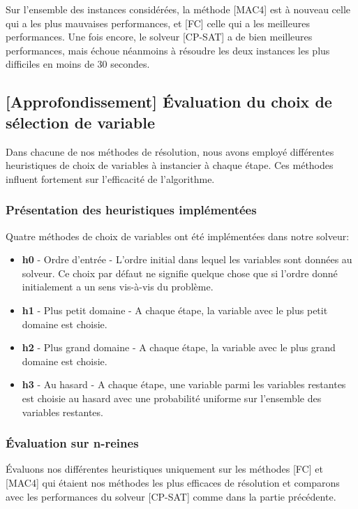 \documentclass[14pt]{article}
\begin{document}
Sur l'ensemble des instances considérées, la méthode [MAC4] est à nouveau celle qui a les plus mauvaises performances, et [FC] celle qui a les meilleures performances. Une fois encore, le solveur [CP-SAT] a de bien meilleures performances, mais échoue néanmoins à résoudre les deux instances les plus difficiles en moins de 30 secondes.

\subsection{[Approfondissement] Évaluation du choix de sélection de variable}

Dans chacune de nos méthodes de résolution, nous avons employé différentes heuristiques de choix de variables à instancier à chaque étape. Ces méthodes influent fortement sur l'efficacité de l'algorithme.

\subsubsection{Présentation des heuristiques implémentées}

Quatre méthodes de choix de variables ont été implémentées dans notre solveur:
\begin{itemize}
	\item \textbf{h0} - Ordre d'entrée - L'ordre initial dans lequel les variables sont données au solveur. Ce choix par défaut ne signifie quelque chose que si l'ordre donné initialement a un sens vis-à-vis du problème.
	\item \textbf{h1} - Plus petit domaine - A chaque étape, la variable avec le plus petit domaine est choisie.
	\item \textbf{h2} - Plus grand domaine - A chaque étape, la variable avec le plus grand domaine est choisie.
	\item \textbf{h3} - Au hasard - A chaque étape, une variable parmi les variables restantes est choisie au hasard avec une probabilité uniforme sur l'ensemble des variables restantes.
\end{itemize}


\subsubsection{Évaluation sur n-reines}

Évaluons nos différentes heuristiques uniquement sur les méthodes [FC] et [MAC4] qui étaient nos méthodes les plus efficaces de résolution et comparons avec les performances du solveur [CP-SAT] comme dans la partie précédente.
\end{document}
